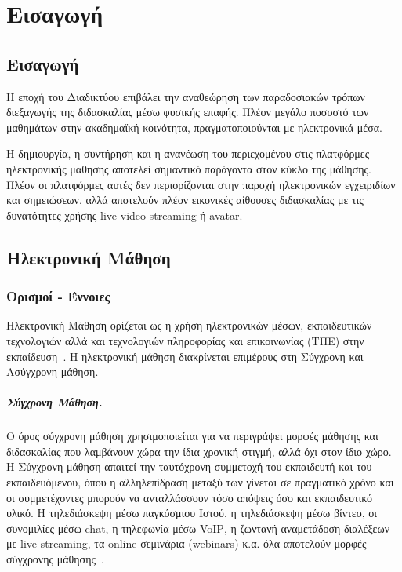 \documentclass[12pt]{report}
\begin{document}
\hypersetup{pageanchor=true}
\clearpage
{}

\chapter{Εισαγωγή}\label{ch1}
\section{Εισαγωγή}
Η εποχή του Διαδικτύου επιβάλει την αναθεώρηση των παραδοσιακών τρόπων διεξαγωγής της διδασκαλίας μέσω φυσικής επαφής. Πλέον μεγάλο ποσοστό των μαθημάτων στην ακαδημαϊκή κοινότητα, πραγματοποιούνται με ηλεκτρονικά μέσα.

Η δημιουργία, η συντήρηση και η ανανέωση του περιεχομένου στις πλατφόρμες ηλεκτρονικής μαθησης αποτελεί σημαντικό παράγοντα στον κύκλο της μάθησης. Πλέον οι πλατφόρμες αυτές δεν περιορίζονται στην παροχή ηλεκτρονικών εγχειριδίων και σημειώσεων, αλλά αποτελούν πλέον εικονικές αίθουσες διδασκαλίας με τις δυνατότητες χρήσης \textlatin{live video streaming} ή \textlatin{avatar}.

\section{Ηλεκτρονική Μάθηση}
\subsection{Ορισμοί - Έννοιες}
Ηλεκτρονική Μάθηση ορίζεται ως η χρήση ηλεκτρονικών μέσων, εκπαιδευτικών τεχνολογιών αλλά και τεχνολογιών πληροφορίας και επικοινωνίας (ΤΠΕ) στην εκπαίδευση~\cite{wikipedia_2018_1}. Η ηλεκτρονική μάθηση διακρίνεται επιμέρους στη Σύγχρονη και Ασύγχρονη μάθηση.
  \paragraph{Σύγχρονη Mάθηση.} Ο όρος σύγχρονη μάθηση χρησιμοποιείται για να περιγράψει μορφές μάθησης και διδασκαλίας που λαμβάνουν χώρα την ίδια χρονική στιγμή, αλλά όχι στον ίδιο χώρο. Η Σύγχρονη μάθηση απαιτεί την ταυτόχρονη συμμετοχή του εκπαιδευτή και του εκπαιδευόμενου, όπου η αλληλεπίδραση μεταξύ των γίνεται σε πραγματικό χρόνο και οι συμμετέχοντες μπορούν να ανταλλάσσουν τόσο απόψεις όσο και εκπαιδευτικό υλικό. Η τηλεδιάσκεψη μέσω παγκόσμιου Ιστού, η τηλεδιάσκεψη μέσω βίντεο, οι συνομιλίες μέσω \textlatin{chat}, η τηλεφωνία μέσω \textlatin{VoIP}, η ζωντανή αναμετάδοση διαλέξεων με \textlatin{live streaming}, τα \textlatin{online} σεμινάρια (\textlatin{webinars}) κ.α. όλα αποτελούν μορφές σύγχρονης μάθησης~\cite{moore_kearsley_2005}.
\end{document}
